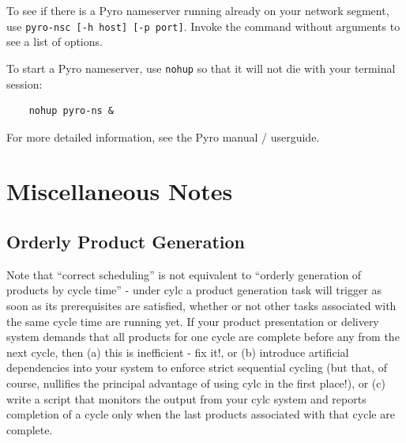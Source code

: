 \documentclass[11pt,a4paper]{article}
\begin{document}
To see if there is a Pyro nameserver running already on your network
segment, use \lstinline=pyro-nsc [-h host] [-p port]=. Invoke the
command without arguments to see a list of options.

To start a Pyro nameserver, use \lstinline{nohup} so that it
will not die with your terminal session: 

\begin{lstlisting}
    nohup pyro-ns &
\end{lstlisting}

For more detailed information, see the Pyro manual / userguide.

\pagebreak
\section{Miscellaneous Notes}
\label{MiscellaneousNotes}

\subsection{Orderly Product Generation}
\label{OrderlyProductGeneration}

Note that ``correct scheduling'' is not equivalent to ``orderly
generation of products by cycle time'' - under cylc a product
generation task will trigger as soon as its prerequisites are satisfied,
whether or not other tasks associated with the same cycle time are
running yet. If your product presentation or delivery system demands
that all products for one cycle are complete before any from the next
cycle, then (a) this is inefficient - fix it!, or (b) introduce artificial
dependencies into your system to enforce strict sequential cycling (but
that, of course, nullifies the principal advantage of using cylc in the
first place!), or (c) write a script that monitors the output from 
your cylc system and reports completion of a cycle only when the last
products associated with that cycle are complete. 

%
\end{document}
